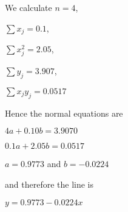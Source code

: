	We calculate 
	$n = 4$, 

	$\sum x_j = 0.1$, 

	$\sum x_j^2 = 2.05$, 

        $\sum y_j = 3.907$, 

        $\sum x_j y_j = 0.0517$

	Hence the normal equations are

	$4a + 0.10b = 3.9070$ 

        $0.1a + 2.05b = 0.0517$ 

	$a = 0.9773$ and $b = -0.0224$ 

	and therefore the line is 

        $y = 0.9773 - 0.0224x$


